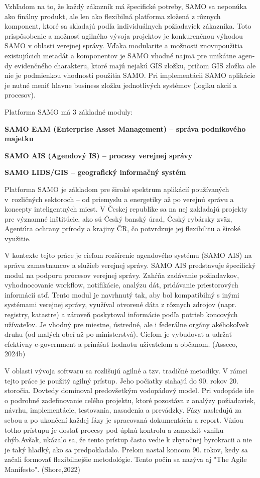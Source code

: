 Vzhľadom na to, že každý zákazník má špecifické potreby, SAMO sa neponúka ako finálny produkt, ale len ako flexibilná platforma zložená z rôznych komponent, ktoré sa skladajú podľa individuálnych požiadaviek zákazníka. Toto prispôsobenie a možnosť agilného vývoja projektov je konkurenčnou výhodou SAMO v oblasti verejnej správy. Vďaka modularite a možnosti znovupoužitia existujúcich metadát a komponentov je SAMO vhodné najmä pre unikátne agen-dy evidenčného charakteru, ktoré majú nejakú GIS zložku, pričom GIS zložka ale nie je podmienkou vhodnosti použitia SAMO. Pri implementácii SAMO aplikácie je nutné meniť hlavne business zložku jednotlivých systémov (logiku akcií a procesov).

Platforma SAMO má 3 základné moduly:

\startitemize
\item \start\bf SAMO EAM \stop (Enterprise Asset Management) --  správa podnikového majetku
\item \start\bf SAMO AIS \stop (Agendový IS) -- procesy verejnej správy
\item  \start\bf SAMO LIDS/GIS \stop -- geografický informačný systém
\stopitemize

Platforma SAMO je základom pre široké spektrum aplikácií používaných v~rozličných sektoroch – od priemyslu a energetiky až po verejnú správu a koncepty inteligentných miest. V Českej republike sa na nej zakladajú projekty pre významné inštitúcie, ako sú Český banský úrad, Český rybársky zväz, Agentúra ochrany prírody a krajiny ČR, čo potvrdzuje jej flexibilitu a široké využitie.


V kontexte tejto práce je cieľom rozšírenie agendového systému (SAMO AIS) na správu zamestnancov a služieb verejnej správy. SAMO AIS predstavuje špecifický modul na podporu procesov verejnej správy. Zahŕňa zadávanie požiadavkov, vyhodnocovanie workflow, notifikácie, analýzu dát, pridávanie priestorových informácií atď. Tento modul je navrhnutý tak, aby bol kompatibilný s inými systémami verejnej správy, využíval otvorené dáta z rôznych zdrojov (napr. registry, katastre) a zároveň poskytoval informácie podľa potrieb koncových užívateľov. Je vhodný pre miestne, ústredné, ale i federálne orgány akéhokoľvek druhu (od malých obcí až po ministerstvá). Cieľom je vybudovať a udržať efektívny e-government a prinášať hodnotu užívateľom a občanom. \scr(Asseco, 2024b)


V oblasti vývoja softwaru sa rozlišujú agilné a tzv. tradičné metodiky. V rámci tejto práce je použitý agilný prístup. Jeho počiatky siahajú do 90. rokov 20. storočia. Dovtedy dominoval predovšetkým vodopádový model. Pri vodopáde ide o podrobné zadefinovanie celého projektu, ktoré pozostáva z analýzy požiadaviek, návrhu, implementácie, testovania, nasadenia a prevádzky. Fázy nasledujú za sebou a po ukončení každej fázy je spracovaná dokumentácia a report. Víziou totho prístupu je dostať procesy pod úplnú kontrolu a zamedziť vzniku chýb.Avšak, ukázalo sa, že tento prístup často vedie k zbytočnej byrokracii a nie je taký hladký, ako sa predpokladalo. Prelom nastal koncom 90. rokov, kedy sa začali formovať flexibilnejšie metodológie. Tento počin sa nazýva aj "The Agile Manifesto". \scr(Shore,2022)

